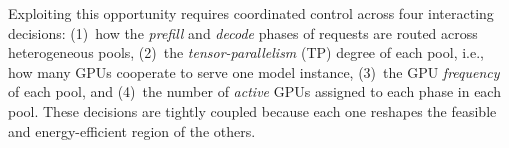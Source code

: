 Exploiting this opportunity requires coordinated control across four interacting decisions:
(1)~how the \emph{prefill} and \emph{decode} phases of requests are routed across heterogeneous pools, (2)~the \emph{tensor-parallelism} (TP) degree of each pool, i.e., how many GPUs cooperate to serve one model instance, (3)~the GPU \emph{frequency} of each pool, and (4)~the number of \emph{active} GPUs assigned to each phase in each pool.
These decisions are tightly coupled because each one reshapes the feasible and energy-efficient region of the others.
